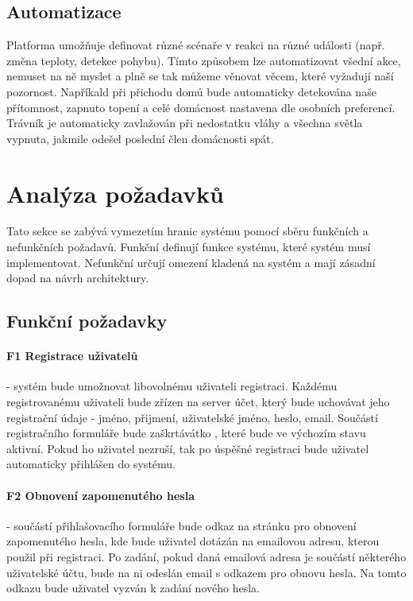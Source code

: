 \subsection{Automatizace}
Platforma umožňuje definovat různé scénaře v reakci na různé události (např. změna teploty, detekce pohybu). Tímto způsobem lze automatizovat všední akce, nemuset na ně myslet a plně se tak můžeme věnovat věcem, které vyžadují naší pozornost. Napříkald při přichodu domů bude automaticky detekována naše přítomnost, zapnuto topení a celé domácnost nastavena dle osobních preferencí. Trávník je automaticky zavlažován při nedostatku vláhy a všechna světla vypnuta, jakmile odešel poslední člen domácnosti spát.



\section{Analýza požadavků} %
Tato sekce se zabývá vymezetím hranic systému pomocí sběru funkčních a nefunkčních požadavů. Funkční definují funkce systému, které systém musí implementovat. Nefunkční určují omezení kladená na systém a mají zásadní dopad na návrh architektury.

\subsection{Funkční požadavky}

\paragraph{F1 Registrace uživatelů}
- systém bude umožnovat libovolnému uživateli registraci. Každému registrovanému uživateli bude zřízen na server účet, který bude uchovávat jeho registrační údaje - jméno, přijmení, uživatelské jméno, heslo, email. Součástí registračního formuláře bude zaškrtávátko , které bude ve výchozím stavu aktivní. Pokud ho uživatel nezruší, tak po úspěšné registraci bude uživatel automaticky přihlášen do systému.

\paragraph{F2 Obnovení zapomenutého hesla}
- součástí přihlašovacího formuláře bude odkaz na stránku pro obnovení zapomenutého hesla, kde bude uživatel dotázán na emailovou adresu, kterou použil při registraci. Po zadání, pokud daná emailová adresa je součástí některého uživatelské účtu, bude na ni odeslán email s odkazem pro obnovu hesla. Na tomto odkazu bude uživatel vyzván k zadání nového hesla.

